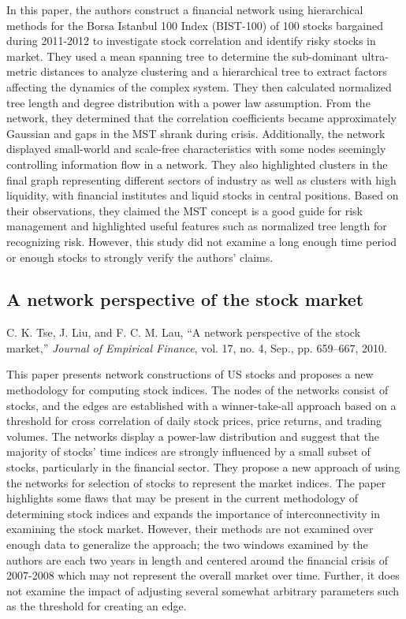 \documentclass[12pt]{article}
\begin{document}
In this paper, the authors construct a financial network using hierarchical methods for the Borsa Istanbul 100 Index (BIST-100) of 100 stocks bargained during 2011-2012 to investigate stock correlation and identify risky stocks in market. They used a mean spanning tree to determine the sub-dominant ultra-metric distances to analyze clustering and a hierarchical tree to extract factors affecting the dynamics of the complex system. They then calculated normalized tree length and degree distribution with a power law assumption. From the network, they determined that the correlation coefficients became approximately Gaussian and gaps in the MST shrank during crisis. Additionally, the network displayed small-world and scale-free characteristics with some nodes seemingly controlling information flow in a network. They also highlighted clusters in the final graph representing different sectors of industry as well as clusters with high liquidity, with financial institutes and liquid stocks in central positions. Based on their observations, they claimed the MST concept is a good guide for risk management and highlighted useful features such as normalized tree length for recognizing risk. However, this study did not examine a long enough time period or enough stocks to strongly verify the authors' claims.


\subsection{A network perspective of the stock market}
C. K. Tse, J. Liu, and F. C. M. Lau, “A network perspective of the stock market,” \textit{Journal of Empirical Finance}, vol. 17, no. 4, Sep., pp. 659–667, 2010. %
\newline

This paper presents network constructions of US stocks and proposes a new methodology for computing stock indices. The nodes of the networks consist of stocks, and the edges are established with a winner-take-all approach based on a threshold for cross correlation of daily stock prices, price returns, and trading volumes. The networks display a power-law distribution and suggest that the majority of stocks' time indices are strongly influenced by a small subset of stocks, particularly in the financial sector. They propose a new approach of using the networks for selection of stocks to represent the market indices. The paper highlights some flaws that may be present in the current methodology of determining stock indices and expands the importance of interconnectivity in examining the stock market. However, their methods are not examined over enough data to generalize the approach; the two windows examined by the authors are each two years in length and centered around the financial crisis of 2007-2008 which may not represent the overall market over time. Further, it does not examine the impact of adjusting several somewhat arbitrary parameters such as the threshold for creating an edge.
\end{document}
